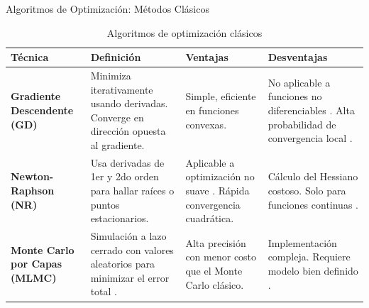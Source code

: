 \documentclass[xcolor={table,dvipsnames}]{beamer}
\begin{document}
\begin{frame}{Algoritmos de Optimizaci\'on: M\'etodos Cl\'asicos}
\begin{table}
    \centering
    \tiny
    \renewcommand{\arraystretch}{1.2}
    \begin{tabularx}{\textwidth}{|>{\raggedright\arraybackslash}p{1.8cm}|X|X|X|}
        \hline
        \rowcolor[HTML]{C0C0C0}
        \textbf{T\'ecnica} & \textbf{Definici\'on} & \textbf{Ventajas} & \textbf{Desventajas} \\ \hline

        \textbf{Gradiente Descendente (GD)} & Minimiza iterativamente usando derivadas. Converge en direcci\'on opuesta al gradiente. & Simple, eficiente en funciones convexas. & No aplicable a funciones no diferenciables \cite{granada2006}. Alta probabilidad de convergencia local \cite{Rojas2018}. \\ \hline

        \textbf{Newton-Raphson (NR)} & Usa derivadas de 1er y 2do orden para hallar ra\'ices o puntos estacionarios. & Aplicable a optimizaci\'on no suave \cite{Loayza2024}. R\'apida convergencia cuadr\'atica. & C\'alculo del Hessiano costoso. Solo para funciones continuas \cite{Nocedal2006}. \\ \hline

        \textbf{Monte Carlo por Capas (MLMC)} & Simulaci\'on a lazo cerrado con valores aleatorios para minimizar el error total \cite{fernandez2019optimizacion}. & Alta precisi\'on con menor costo que el Monte Carlo cl\'asico. & Implementaci\'on compleja. Requiere modelo bien definido \cite{zhang2024computer}. \\ \hline
    \end{tabularx}
    \caption{Algoritmos de optimizaci\'on cl\'asicos}
    \label{tab:alg_opt}
\end{table}
\end{frame}
\end{document}

